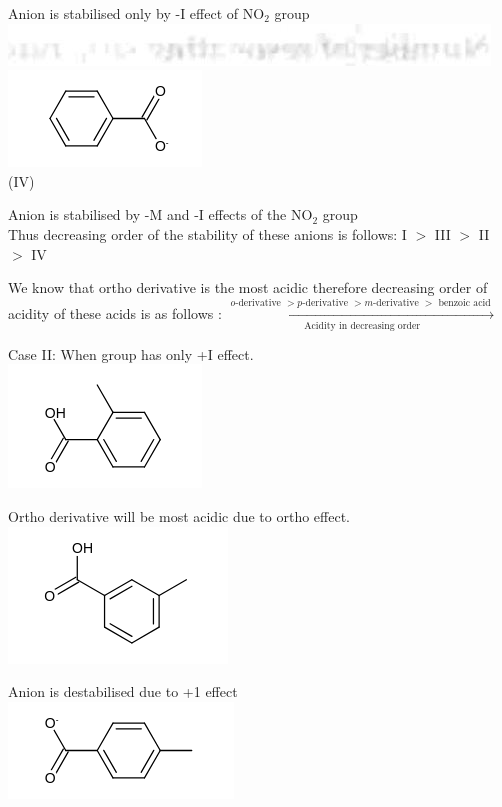 \documentclass[10pt]{article}
\begin{document}
Anion is stabilised only by -I effect of $\mathrm{NO}_{2}$ group\\
\includegraphics[max width=\textwidth, center]{2025_01_28_8470952b98110cec3aabg-077}\\
\includegraphics{smile-0f6c96f7754d459ab10e2c54a3129b671afde506}\\
(IV)

Anion is stabilised by -M and -I effects of the $\mathrm{NO}_{2}$ group\\
Thus decreasing order of the stability of these anions is follows: I $>$ III $>$ II $>$ IV

We know that ortho derivative is the most acidic therefore decreasing order of acidity of these acids is as follows : $\xrightarrow[\text { Acidity in decreasing order }]{o \text {-derivative }>p \text {-derivative }>m \text {-derivative }>\text { benzoic acid }}$

Case II: When group has only +I effect.\\
\includegraphics{smile-3e52fb6fef623bcaa5eb89900dd8e4a2158e1466}

Ortho derivative will be most acidic due to ortho effect.\\
\includegraphics{smile-54412115e1c3ca7f3885009ffd5d56ee2aadfdf5}

Anion is destabilised due to +1 effect\\
\includegraphics{smile-7f1a7d0354d0a9d65432b9d5f3674eb92772fa77}
\end{document}

